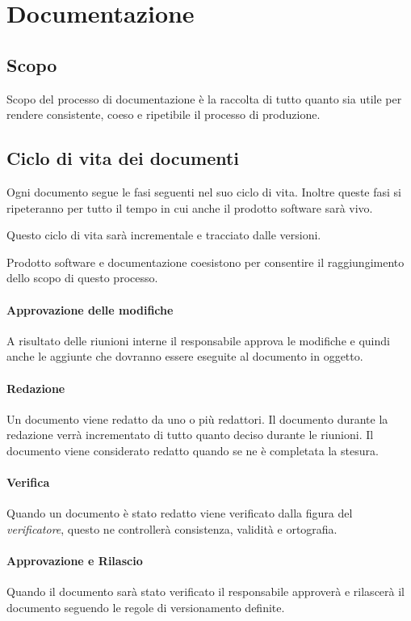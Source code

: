 \section{Documentazione}\label{s:documentazione}

\subsection{Scopo}

Scopo del processo di documentazione è la raccolta di tutto quanto sia utile per rendere consistente, coeso e ripetibile il processo di produzione.

\subsection{Ciclo di vita dei documenti}

Ogni documento segue le fasi seguenti nel suo ciclo di vita. Inoltre queste fasi si ripeteranno per tutto il tempo in cui anche il prodotto software sarà vivo.

Questo ciclo di vita sarà incrementale e tracciato dalle versioni.

Prodotto software e documentazione coesistono per consentire il raggiungimento dello scopo di questo processo.

\paragraph{Approvazione delle modifiche} A risultato delle riunioni interne il responsabile approva le modifiche e quindi anche le aggiunte che dovranno essere eseguite al documento in oggetto.

\paragraph{Redazione} Un documento viene redatto da uno o più redattori. Il documento durante la redazione verrà incrementato di tutto quanto deciso durante le riunioni. Il documento viene considerato redatto quando se ne è completata la stesura.

\paragraph{Verifica} Quando un documento è stato redatto viene verificato dalla figura del \textit{verificatore}, questo ne controllerà consistenza, validità e ortografia.

\paragraph{Approvazione e Rilascio} Quando il documento sarà stato verificato il responsabile approverà e rilascerà il documento seguendo le regole di versionamento definite.

